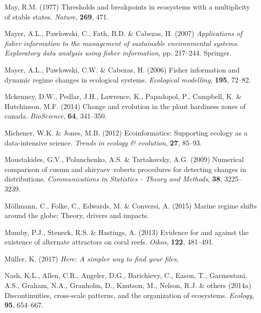 \documentclass[12pt,twoside,openany]{reedthesis}
\begin{document}
\leavevmode\hypertarget{ref-may1977thresholds}{}%
May, R.M. (1977) Thresholds and breakpoints in ecosystems with a multiplicity of stable states. \emph{Nature}, \textbf{269}, 471.

\leavevmode\hypertarget{ref-mayer_applications_2007}{}%
Mayer, A.L., Pawlowski, C., Fath, B.D. \& Cabezas, H. (2007) \emph{Applications of fisher information to the management of sustainable environmental systems}. \emph{Exploratory data analysis using fisher information}, pp. 217--244. Springer.

\leavevmode\hypertarget{ref-mayer_fisher_2006}{}%
Mayer, A.L., Pawlowski, C.W. \& Cabezas, H. (2006) Fisher information and dynamic regime changes in ecological systems. \emph{Ecological modelling}, \textbf{195}, 72--82.

\leavevmode\hypertarget{ref-mckenney2014change}{}%
Mckenney, D.W., Pedlar, J.H., Lawrence, K., Papadopol, P., Campbell, K. \& Hutchinson, M.F. (2014) Change and evolution in the plant hardiness zones of canada. \emph{BioScience}, \textbf{64}, 341--350.

\leavevmode\hypertarget{ref-michener2012ecoinformatics}{}%
Michener, W.K. \& Jones, M.B. (2012) Ecoinformatics: Supporting ecology as a data-intensive science. \emph{Trends in ecology \& evolution}, \textbf{27}, 85--93.

\leavevmode\hypertarget{ref-moustakides2009numerical}{}%
Moustakides, G.V., Polunchenko, A.S. \& Tartakovsky, A.G. (2009) Numerical comparison of cusum and shiryaev--roberts procedures for detecting changes in distributions. \emph{Communications in Statistics - Theory and Methods}, \textbf{38}, 3225--3239.

\leavevmode\hypertarget{ref-mollmann2015marine}{}%
Möllmann, C., Folke, C., Edwards, M. \& Conversi, A. (2015) Marine regime shifts around the globe: Theory, drivers and impacts.

\leavevmode\hypertarget{ref-mumby2013evidence}{}%
Mumby, P.J., Steneck, R.S. \& Hastings, A. (2013) Evidence for and against the existence of alternate attractors on coral reefs. \emph{Oikos}, \textbf{122}, 481--491.

\leavevmode\hypertarget{ref-here}{}%
Müller, K. (2017) \emph{Here: A simpler way to find your files},

\leavevmode\hypertarget{ref-nash2014discontinuities}{}%
Nash, K.L., Allen, C.R., Angeler, D.G., Barichievy, C., Eason, T., Garmestani, A.S., Graham, N.A., Granholm, D., Knutson, M., Nelson, R.J. \& others (2014a) Discontinuities, cross-scale patterns, and the organization of ecosystems. \emph{Ecology}, \textbf{95}, 654--667.
\end{document}
